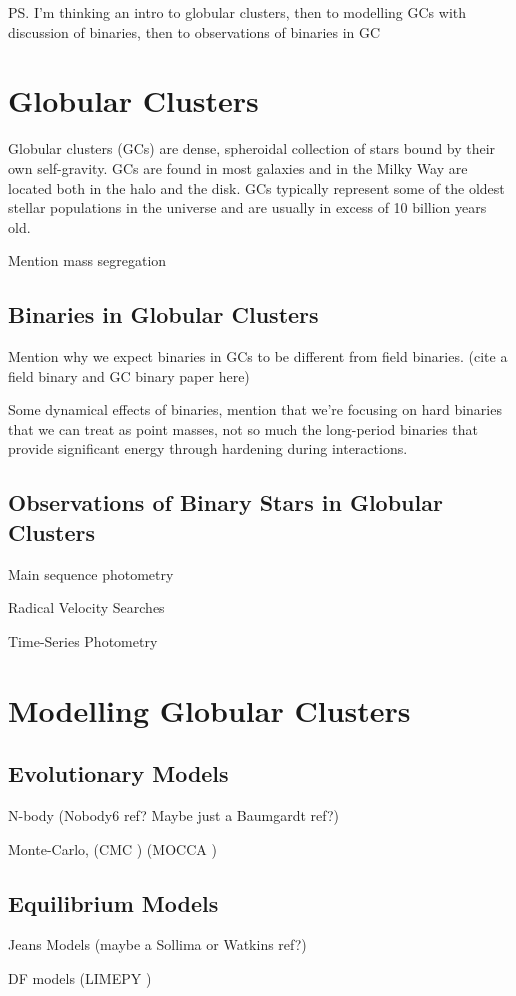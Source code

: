 \ps{I'm thinking an intro to globular clusters, then to modelling GCs with discussion of binaries,
	then to observations of binaries in GC}

\section{Globular Clusters}

Globular clusters (GCs) are dense, spheroidal collection of stars bound by their own self-gravity.
GCs are found in most galaxies and in the Milky Way are located both in the halo and the disk. GCs
typically represent some of the oldest stellar populations in the universe and are usually in excess
of 10 billion years old.

Mention mass segregation

\subsection{Binaries in Globular Clusters}

Mention why we expect binaries in GCs to be different from field binaries. (cite a field binary and GC binary paper here)

Some dynamical effects of binaries, mention that we're focusing on hard binaries that we can treat
as point masses, not so much the long-period binaries that provide significant energy through
hardening during interactions.

\subsection{Observations of Binary Stars in Globular Clusters}

Main sequence photometry \citet{Milone2012}

Radical Velocity Searches \citet{Giesers2019}

Time-Series Photometry \citet{Albrow2001}

\section{Modelling Globular Clusters}

\subsection{Evolutionary Models}
N-body (Nobody6 ref? Maybe just a Baumgardt ref?)

Monte-Carlo, (CMC \citet{Rodriguez2021}) (MOCCA \citet{Hypki2013,Giersz2013})
\subsection{Equilibrium Models}

Jeans Models (maybe a Sollima or Watkins ref?)

DF models (LIMEPY \citet{Gieles2015})

